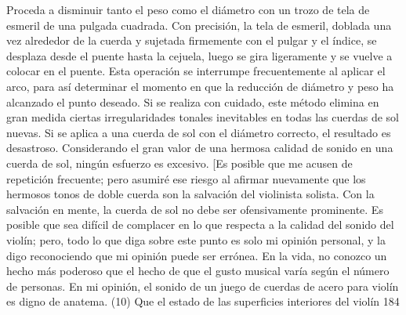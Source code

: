 Proceda a disminuir tanto el peso como el diámetro con un trozo de tela de esmeril de una pulgada cuadrada. Con precisión, la tela de esmeril, doblada una vez alrededor de la cuerda y sujetada firmemente con el pulgar y el índice, se desplaza desde el puente hasta la cejuela, luego se gira ligeramente y se vuelve a colocar en el puente. Esta operación se interrumpe frecuentemente al aplicar el arco, para así determinar el momento en que la reducción de diámetro y peso ha alcanzado el punto deseado. Si se realiza con cuidado, este método elimina en gran medida ciertas irregularidades tonales inevitables en todas las cuerdas de sol nuevas. Si se aplica a una cuerda de sol con el diámetro correcto, el resultado es desastroso. Considerando el gran valor de una hermosa calidad de sonido en una cuerda de sol, ningún esfuerzo es excesivo.
[Es posible que me acusen de repetición frecuente; pero asumiré ese riesgo al afirmar nuevamente que los hermosos tonos de doble cuerda son la salvación del violinista solista. Con la salvación en mente, la cuerda de sol no debe ser ofensivamente prominente. Es posible que sea difícil de complacer en lo que respecta a la calidad del sonido del violín; pero, todo lo que diga sobre este punto es solo mi opinión personal, y la digo reconociendo que mi opinión puede ser errónea. En la vida, no conozco un hecho más poderoso que el hecho de que el gusto musical varía según el número de personas. En mi opinión, el sonido de un juego de cuerdas de acero para violín es digno de anatema.
(10) Que el estado de las superficies interiores del violín
184

